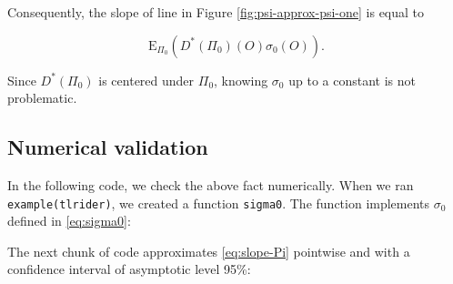 \documentclass[11pt,openright,twoside]{book}
\newenvironment{Shaded}{\begin{snugshade}}{\end{snugshade}}
\newcommand{\CommentTok}[1]{\textcolor[rgb]{0.56,0.35,0.01}{\textit{#1}}}
\newcommand{\NormalTok}[1]{#1}
\newcommand{\Exp}{\textrm{E}}
\theoremstyle{definition}
\theoremstyle{definition}
\theoremstyle{definition}
\theoremstyle{remark}
\begin{document}
Consequently, the slope of line in Figure \ref{fig:psi-approx-psi-one} is
equal to

\begin{equation}
\Exp_{\Pi_{0}} (D^{*}(\Pi_{0}) (O) \sigma_{0}(O)). \label{eq:slope-Pi}
\end{equation}

Since \(D^{*}(\Pi_{0})\) is centered under \(\Pi_{0}\), knowing \(\sigma_{0}\) up
to a constant is not problematic.

\hypertarget{numerical-validation}{%
\subsection{Numerical validation}\label{numerical-validation}}

In the following code, we check the above fact numerically. When we ran
\texttt{example(tlrider)}, we created a function \texttt{sigma0}. The function implements
\(\sigma_{0}\) defined in \eqref{eq:sigma0}:

\begin{Shaded}
\end{Shaded}

The next chunk of code approximates
\eqref{eq:slope-Pi} pointwise and with a confidence interval of asymptotic
level 95\%:
\end{document}
